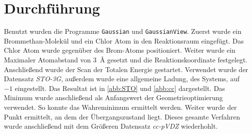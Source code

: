 \section{Durchführung}
Benutzt wurden die Programme \texttt{Gaussian} und \texttt{GaussianView}.
Zuerst wurde ein Brommethan-Molekül und ein Chlor Atom in den Reaktionsraum eingefügt. 
Das Chlor Atom wurde gegenüber des Brom-Atoms positioniert. 
Weiter wurde ein Maximaler Atomabstand von \qty{3}{\angstrom} gesetzt und die Reaktionskoordinate festgelegt.
Anschließend wurde der Scan der Totalen Energie gestartet.
Verwendet wurde der Datensatz \textit{STO-3G}, außerdem wurde eine allgemeine Ladung, des Systems, auf $-1$ eingestellt.
Das Resultat ist in \ref{abb:STO} und \ref{abb:cc} dargestellt. 
Das Minimum wurde anschließend als Anfangswert der Geometrieoptimierung verwendet.
So konnte das Wahreminimum ermittelt werden.
Weiter wurde der Punkt ermittelt, an dem der Übergangszustand liegt.
Dieses gesamte Verfahren wurde anschließend mit dem Größeren Datensatz \textit{cc-pVDZ} wiederhohlt.
